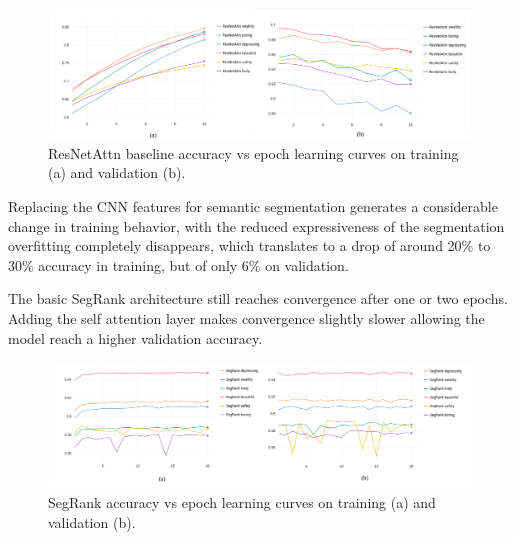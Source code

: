 \begin{figure}[ht]
	\begin{center}
	\includegraphics[width=1\textwidth]{./figures/resnet_attn_graph.png}
	\caption[ResNetAttn Training curves]{
        ResNetAttn baseline accuracy vs epoch learning curves on training (a) and validation (b).
        }
	\label{fig:resnet_attn_graph}
	\end{center}
\end{figure}

Replacing the CNN features for semantic segmentation generates a considerable change in training
behavior, with the reduced expressiveness of the segmentation overfitting completely disappears,
which translates to a drop of around 20\% to 30\% accuracy in training, but of only 6\% on validation.

The basic SegRank architecture still reaches convergence after one or two epochs.
Adding the self attention layer makes convergence slightly slower allowing the model reach a higher validation accuracy.


\begin{figure}[ht]
	\begin{center}
	\includegraphics[width=1\textwidth]{./figures/segrank_graph.png}
	\caption[SegRank Training curves]{
        SegRank accuracy vs epoch learning curves on training (a) and validation (b).
        }
	\label{fig:segrank_graph}
	\end{center}
\end{figure}

